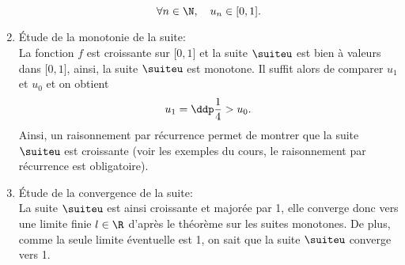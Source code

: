 \documentclass[a4paper, 11pt]{article}
\begin{document}
\begin{correction}
\begin{enumerate}
$$\forall n\in\N,\quad u_n\in\lbrack 0,1\rbrack.$$
\noindent 
\item \'Etude de la monotonie de la suite:\\
La fonction $f$ est croissante sur $\lbrack 0,1\rbrack$ et la suite $\suiteu$ est bien \`a valeurs dans $\lbrack 0,1\rbrack$, ainsi, la suite $\suiteu$ est monotone. Il suffit alors de comparer $u_1$ et $u_0$ et on obtient
$$u_1=\ddp\frac{1}{4}>u_0.$$
Ainsi, un raisonnement par r\'ecurrence permet de montrer que la suite $\suiteu$ est croissante (voir les exemples du cours, le raisonnement par r\'ecurrence est obligatoire).
\noindent 
\item \'Etude de la convergence de la suite:\\
\noindent La suite $\suiteu$ est ainsi croissante et major\'ee par 1, elle converge donc vers une limite finie $l\in\R$ d'apr\`es le th\'eor\`eme sur les suites monotones. De plus, comme la seule limite \'eventuelle est 1, on sait que la suite $\suiteu$ converge vers 1.
\end{enumerate}
\end{correction}
\end{document}
